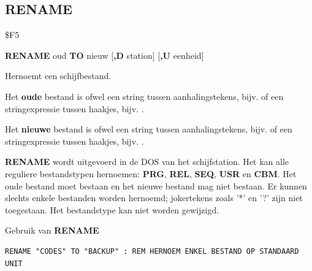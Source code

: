 
\newpage
\subsection{RENAME}
\begin{description}[leftmargin=2cm,style=nextline]
\item [Token:]    \$F5

\item [Formaat:]   {\bf RENAME} oud {\bf TO} nieuw [{\bf,D} station] [{\bf,U} eenheid]

\item [Gebruik:]    Hernoemt een schijfbestand.

                  Het {\bf oude} bestand is ofwel een string tussen aanhalingstekens, bijv.  of een stringexpressie tussen haakjes, bijv. .

                  Het {\bf nieuwe} bestand is ofwel een string tussen aanhalingstekens, bijv.  of een stringexpressie tussen haakjes, bijv. .

                  \drivedefinition

                  \unitdefinition

\item [Opmerkingen:]  {\bf RENAME} wordt uitgevoerd in de DOS van het schijfstation. Het kan alle reguliere bestandstypen hernoemen: {\bf PRG}, {\bf REL}, {\bf SEQ}, {\bf USR} en {\bf CBM}. Het oude bestand moet bestaan en het nieuwe bestand mag niet bestaan. Er kunnen slechts enkele bestanden worden hernoemd; jokertekens zoals '*' en '?' zijn niet toegestaan. Het bestandstype kan niet worden gewijzigd.

\item [Voorbeeld:]  Gebruik van {\bf RENAME}

\begin{tcolorbox}[colback=black,coltext=white]
\verbatimfont{\codefont}
\begin{verbatim}
RENAME "CODES" TO "BACKUP" : REM HERNOEM ENKEL BESTAND OP STANDAARD UNIT
\end{verbatim}
\end{tcolorbox}
\end{description}


\newpage
